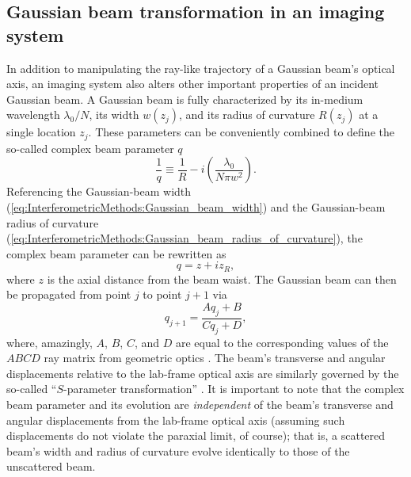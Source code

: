\subsection{Gaussian beam transformation in an imaging system}
\label{sec:InterferometricMethods:imaging:Gaussian_beam_transformation}
In addition to manipulating the ray-like trajectory
of a Gaussian beam's optical axis,
an imaging system also alters
other important properties of an incident Gaussian beam.
A Gaussian beam is fully characterized by
its in-medium wavelength $\lambda_0 / N$,
its width $w(z_j)$, and
its radius of curvature $R(z_j)$
at a single location $z_j$.
These parameters can be conveniently combined
to define the so-called complex beam parameter $q$
\cite[Sec.~17.1]{siegman_lasers}
\begin{equation}
  \frac{1}{q}
  \equiv
  \frac{1}{R}
  -
  i \left( \frac{\lambda_0}{N \pi w^2} \right).
  \label{eq:InterferometricMethods:complex_beam_parameter_inverse}
\end{equation}
Referencing the Gaussian-beam width
(\ref{eq:InterferometricMethods:Gaussian_beam_width}) and
the Gaussian-beam radius of curvature
(\ref{eq:InterferometricMethods:Gaussian_beam_radius_of_curvature}),
the complex beam parameter can be rewritten as
\begin{equation}
  q = z + i z_R,
  \label{eq:InterferometricMethods:complex_beam_parameter}
\end{equation}
where $z$ is the axial distance from the beam waist.
The Gaussian beam can then be propagated from point $j$ to point $j + 1$ via
\begin{equation}
  q_{j+1}
  =
  \frac{A q_j + B}{C q_j + D},
  \label{eq:InterferometricMethods:complex_beam_parameter_propagation}
\end{equation}
where, amazingly, $A$, $B$, $C$, and $D$
are equal to the corresponding values
of the $ABCD$ ray matrix from geometric optics
\cite[Sec.~20.2]{siegman_lasers} \cite{tovar_generalized_beam_matrices_IV}.
The beam's transverse and angular displacements
relative to the lab-frame optical axis
are similarly governed by the so-called ``$S$-parameter transformation''
\cite{tovar_generalized_beam_matrices_IV}.
It is important to note that the complex beam parameter and its evolution
are \emph{independent} of the beam's transverse and angular displacements
from the lab-frame optical axis
(assuming such displacements do not violate the paraxial limit, of course);
that is, a scattered beam's width and radius of curvature
evolve identically to those of the unscattered beam.


